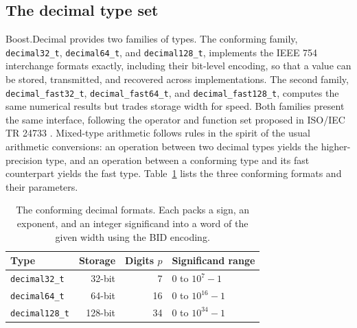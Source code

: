 \documentclass[acmsmall]{acmart}
\begin{document}
\subsection{The decimal type set}
Boost.Decimal provides two families of types. The conforming family,
\texttt{decimal32\_t}, \texttt{decimal64\_t}, and \texttt{decimal128\_t}, implements
the IEEE 754 interchange formats exactly, including their bit-level encoding, so that a
value can be stored, transmitted, and recovered across implementations. The second
family, \texttt{decimal\_fast32\_t}, \texttt{decimal\_fast64\_t}, and
\texttt{decimal\_fast128\_t}, computes the same numerical results but trades storage
width for speed. Both families present the same interface, following the operator and
function set proposed in ISO/IEC TR 24733 \cite{tr24733}. Mixed-type arithmetic follows
rules in the spirit of the usual arithmetic conversions: an operation between two
decimal types yields the higher-precision type, and an operation between a conforming
type and its fast counterpart yields the fast type. Table~\ref{tab:formats} lists the
three conforming formats and their parameters.

\begin{table}
  \caption{The conforming decimal formats. Each packs a sign, an exponent, and an integer
    significand into a word of the given width using the BID encoding.}
  \label{tab:formats}
  \footnotesize
  \begin{tabular}{lrrl}
    \toprule
    Type & Storage & Digits $p$ & Significand range \\
    \midrule
    \texttt{decimal32\_t}  & 32-bit  & 7  & $0$ to $10^{7}-1$ \\
    \texttt{decimal64\_t}  & 64-bit  & 16 & $0$ to $10^{16}-1$ \\
    \texttt{decimal128\_t} & 128-bit & 34 & $0$ to $10^{34}-1$ \\
    \bottomrule
  \end{tabular}
\end{table}
\end{document}
